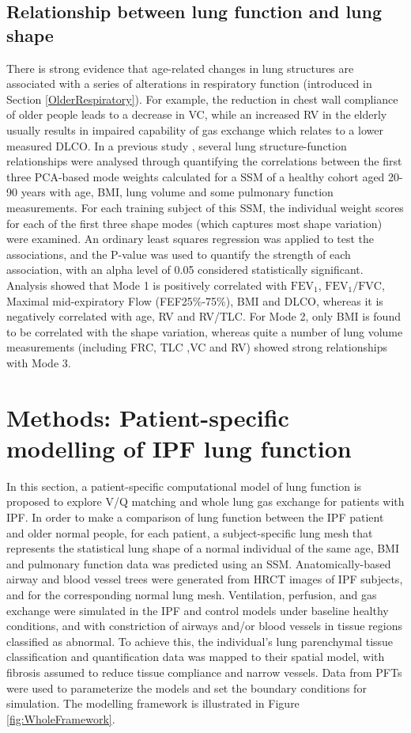 \subsection{Relationship between lung function and lung shape}
There is strong evidence that age-related changes in lung structures are associated with a series of alterations in respiratory function (introduced in Section \ref{OlderRespiratory}). For example, the reduction in chest wall compliance of older people leads to a decrease in VC, while an increased RV in the elderly usually results in impaired capability of gas exchange which relates to a lower measured DLCO. In a previous study \citep{Osanlouy2018Statistical}, several lung structure-function relationships were analysed through quantifying the correlations between the first three PCA-based mode weights calculated for a SSM of a healthy cohort aged 20-90 years with age, BMI, lung volume and some pulmonary function measurements. For each training subject of this SSM, the individual weight scores for each of the first three shape modes (which captures most shape variation) were examined. An ordinary least squares regression was applied to test the associations, and the P-value was used to quantify the strength of each association, with an alpha level of 0.05 considered statistically significant. Analysis showed that Mode 1 is positively correlated with $\mathrm{FEV_1}$, $\mathrm{FEV_1/FVC}$, Maximal mid-expiratory Flow (FEF25\%-75\%), BMI and DLCO, whereas it is negatively correlated with age, RV and RV/TLC. For Mode 2, only BMI is found to be correlated with the shape variation, whereas quite a number of lung volume measurements (including FRC, TLC ,VC and RV) showed strong relationships with Mode 3.
\newpage

\section{Methods: Patient-specific modelling of IPF lung function}
In this section, a patient-specific computational model of lung function is proposed to explore V/Q matching and whole lung gas exchange for patients with IPF. In order to make a comparison of lung function between the IPF patient and older normal people, for each patient, a subject-specific lung mesh that represents the statistical lung shape of a normal individual of the same age, BMI and pulmonary function data was predicted using an SSM. Anatomically-based airway and blood vessel trees were generated from HRCT images of IPF subjects, and for the corresponding normal lung mesh. Ventilation, perfusion, and gas exchange were simulated in the IPF and control models under baseline healthy conditions, and with constriction of airways and/or blood vessels in tissue regions classified as abnormal. To achieve this, the individual's lung parenchymal tissue classification and quantification data was mapped to their spatial model, with fibrosis assumed to reduce tissue compliance and narrow vessels. Data from PFTs were used to parameterize the models and set the boundary conditions for simulation. The modelling framework is illustrated in Figure \ref{fig:WholeFramework}. 

